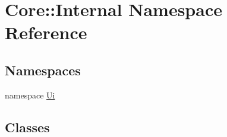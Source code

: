 \hypertarget{namespace_core_1_1_internal}{\section{Core\-:\-:Internal Namespace Reference}
\label{namespace_core_1_1_internal}
}
\subsection*{Namespaces}
\begin{DoxyCompactItemize}
\item 
namespace \hyperlink{namespace_core_1_1_internal_1_1_ui}{Ui}
\end{DoxyCompactItemize}
\subsection*{Classes}
